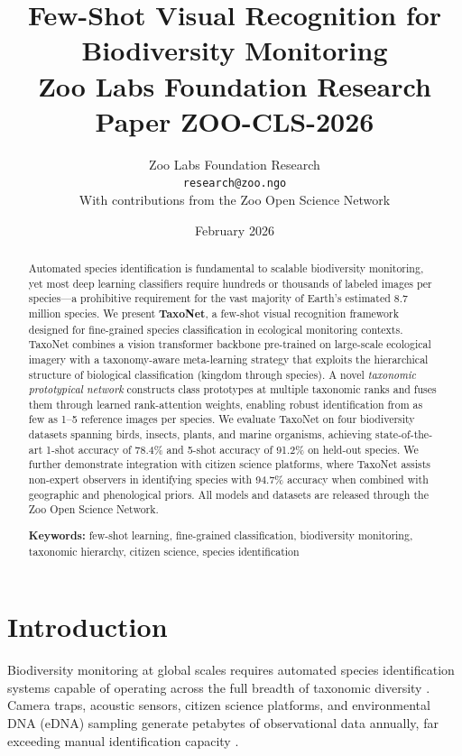 \documentclass[11pt,a4paper]{article}
\title{%
  \textbf{Few-Shot Visual Recognition for\\Biodiversity Monitoring}\\[0.5em]
  \large Zoo Labs Foundation Research Paper ZOO-CLS-2026
}
\author{
  Zoo Labs Foundation Research\\
  \texttt{research@zoo.ngo}\\[0.5em]
  \small With contributions from the Zoo Open Science Network
}
\date{February 2026}
\begin{document}
\maketitle

\begin{abstract}
\noindent
Automated species identification is fundamental to scalable biodiversity
monitoring, yet most deep learning classifiers require hundreds or
thousands of labeled images per species---a prohibitive requirement for
the vast majority of Earth's estimated 8.7 million species. We present
\textbf{TaxoNet}, a few-shot visual recognition framework designed for
fine-grained species classification in ecological monitoring contexts.
TaxoNet combines a vision transformer backbone pre-trained on large-scale
ecological imagery with a taxonomy-aware meta-learning strategy that
exploits the hierarchical structure of biological classification (kingdom
through species). A novel \emph{taxonomic prototypical network}
constructs class prototypes at multiple taxonomic ranks and fuses them
through learned rank-attention weights, enabling robust identification
from as few as 1--5 reference images per species. We evaluate TaxoNet on
four biodiversity datasets spanning birds, insects, plants, and marine
organisms, achieving state-of-the-art 1-shot accuracy of 78.4\% and
5-shot accuracy of 91.2\% on held-out species. We further demonstrate
integration with citizen science platforms, where TaxoNet assists
non-expert observers in identifying species with 94.7\% accuracy when
combined with geographic and phenological priors. All models and datasets
are released through the Zoo Open Science Network.

\medskip
\noindent\textbf{Keywords:} few-shot learning, fine-grained
classification, biodiversity monitoring, taxonomic hierarchy, citizen
science, species identification
\end{abstract}

\newpage
\tableofcontents
\newpage

\section{Introduction}
\label{sec:introduction}

Biodiversity monitoring at global scales requires automated species
identification systems capable of operating across the full breadth of
taxonomic diversity \citep{christin2019applications}. Camera traps,
acoustic sensors, citizen science platforms, and environmental DNA (eDNA)
sampling generate petabytes of observational data annually, far exceeding
manual identification capacity \citep{steenweg2017scaling}.
\end{document}
